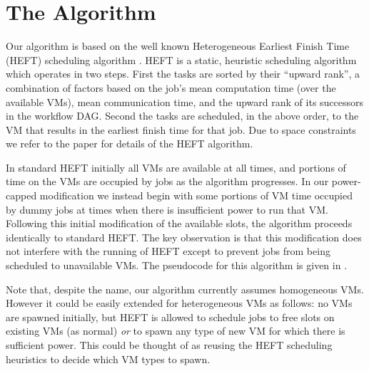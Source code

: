 \documentclass[10pt, conference, compsocconf]{IEEEtran} %
\begin{document}
\section{The Algorithm}

Our algorithm is based on the well known Heterogeneous Earliest Finish Time (HEFT) scheduling algorithm \cite{Topcuoglu2002heft}.
HEFT is a static, heuristic scheduling algorithm which operates in two steps.
First the tasks are sorted by their ``upward rank'', a combination of factors based on the job's mean computation time (over the available VMs), mean communication time, and the upward rank of its successors in the workflow DAG.
Second the tasks are scheduled, in the above order, to the VM that results in the earliest finish time for that job.
Due to space constraints we refer to the paper \cite{Topcuoglu2002heft} for details of the HEFT algorithm.

In standard HEFT initially all VMs are available at all times, and portions of time on the VMs are occupied by jobs as the algorithm progresses.
In our power-capped modification we instead begin with some portions of VM time occupied by dummy jobs at times when there is insufficient power to run that VM.
Following this initial modification of the available slots, the algorithm proceeds identically to standard HEFT.
The key observation is that this modification does not interfere with the running of HEFT except to prevent jobs from being scheduled to unavailable VMs.
The pseudocode for this algorithm is given in .

Note that, despite the name, our algorithm currently assumes homogeneous VMs.
However it could be easily extended for heterogeneous VMs as follows: no VMs are spawned initially, but HEFT is allowed to schedule jobs to free slots on existing VMs (as normal) \emph{or} to spawn any type of new VM for which there is sufficient power.
This could be thought of as reusing the HEFT scheduling heuristics to decide which VM types to spawn.

\end{document}

